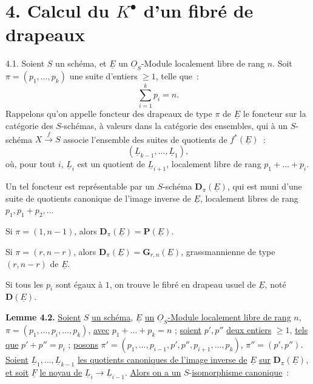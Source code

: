 
\section*{4. Calcul du \(K^{\bullet}\) d'un fibré de drapeaux}

4.1.
Soient \(S\) un schéma, et \(\underline{E}\) un \(\underline{O}_S\)-Module localement libre de rang \(n\). Soit \(\pi=(p_1,\ldots,p_k)\) une suite d'entiers \(\geq1\), telle que~:
\[
  \sum_{i=1}^k p_i=n.
\]
Rappelons qu'on appelle foncteur des drapeaux de type \(\pi\) de \(\underline{E}\) le foncteur sur la catégorie des \(S\)-schémas, à valeurs dans la catégorie des ensembles, qui à un \(S\)-schéma \(X\xrightarrow{f} S\) associe l'ensemble des suites de quotients de \(f^*(\underline{E})\)~:
\[
  (\underline{L}_{k-1},\ldots,\underline{L}_1),
\]
où, pour tout \(i\), \(\underline{L}_i\) est un quotient de \(\underline{L}_{i+1}\), localement libre de rang \(p_1+\ldots+p_i\).

Un tel foncteur est représentable par un \(S\)-schéma \(\mathbf D_\pi(\underline{E})\), qui est muni d'une suite de quotients canonique de l'image inverse de \(\underline{E}\), localement libres de rang \(p_1,p_1+p_2,\ldots\)

Si \(\pi=(1,n-1)\), alors \(\mathbf D_\pi(\underline{E})=\mathbf P(\underline{E})\).

Si \(\pi=(r,n-r)\), alors \(\mathbf D_\pi(\underline{E})=\mathbf G_{r,n}(\underline{E})\), grassmannienne de type \((r,n-r)\) de \(\underline{E}\).

Si tous les \(p_i\) sont égaux à \(1\), on trouve le fibré en drapeau usuel de \(\underline{E}\), noté \(\mathbf D(\underline{E})\).

\textbf{Lemme 4.2.} \uline{Soient} \(S\) \uline{un schéma}, \(\underline{E}\) \uline{un} \(\underline{O}_S\)\uline{-Module localement libre de rang} \(n\), \(\pi=(p_1,\ldots,p_i,\ldots,p_k)\), \uline{avec} \(p_1+\ldots+p_k=n\) ; \uline{soient} \(p',p''\) \uline{deux entiers} \(\geq1\), \uline{tels que} \(p'+p''=p_i\) ; \uline{posons} \(\pi'=(p_1,\ldots,p_{i-1},p',p'',p_{i+1},\ldots,p_k)\), \(\pi''=(p',p'')\). \uline{Soient} \(\underline{L}_1,\ldots,\underline{L}_{k-1}\) \uline{les quotients canoniques de l'image inverse de} \(\underline{E}\) \uline{sur} \(\mathbf D_\pi(\underline{E})\), \uline{et soit} \(\underline{F}\) \uline{le noyau de} \(\underline{L}_i\to \underline{L}_{i-1}\). \uline{Alors on a un} \(S\)-\uline{isomorphisme canonique}~:
